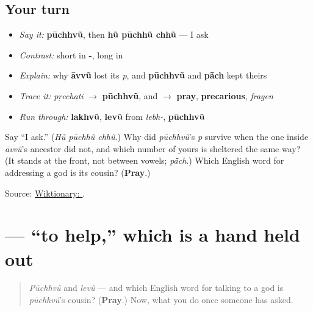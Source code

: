 \subsection*{Your turn}
\begin{itemize}
\raggedright
  \item \emph{Say it:} \textbf{pūchhvũ}, then \textbf{hũ pūchhũ chhũ} — I ask
  \item \emph{Contrast:} short \textbf{} in \textbf{-}, long \textbf{} in \textbf{}
  \item \emph{Explain:} why \textbf{āvvũ} lost its \emph{p}, and \textbf{pūchhvũ} and \textbf{pā̃ch} kept theirs
  \item \emph{Trace it:} \emph{pṛcchati} $\to$ \textbf{pūchhvũ}, and $\to$ \textbf{pray}, \textbf{precarious}, \emph{fragen}
  \item \emph{Run through:} \textbf{lakhvũ}, \textbf{levũ} from \emph{lebh-}, \textbf{pūchhvũ}
\end{itemize}

\begin{tcolorbox}[breakable,colback=teal!4,colframe=teal!35!black,title={Before you move on}]
Say \textquotedblleft{}I ask.\textquotedblright{} (\emph{Hũ pūchhũ chhũ}.) Why did \emph{pūchhvũ}'s \emph{p} survive when the one inside \emph{āvvũ}'s ancestor did not, and which number of yours is sheltered the same way? (It stands at the front, not between vowels; \emph{pā̃ch}.) Which English word for addressing a god is its cousin? (\textbf{Pray}.)

Source: \href{https://en.wiktionary.org/wiki/\%E0\%AA\%AA\%E0\%AB\%82\%E0\%AA\%9B\%E0\%AA\%B5\%E0\%AB\%81\%E0\%AA\%82}{Wiktionary: }.
\end{tcolorbox}
\section[\texorpdfstring{\gu{મદદ} \gu{કરવી} (madad karvī)}{મદદ કરવી (madad karvī)}]{  — \textquotedblleft{}to help,\textquotedblright{} which is a hand held out}

\label{lesson:GU-C09-madad-karvi}



\begin{quote}
\emph{Pūchhvũ} and \emph{levũ} — and which English word for talking to a god is \emph{pūchhvũ}'s cousin? (\textbf{Pray}.) Now, what you do once someone has asked.
\end{quote}

